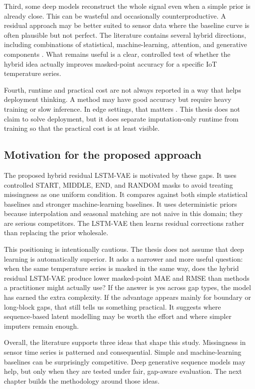 Third, some deep models reconstruct the whole signal even when a simple prior is already close. This can be wasteful and occasionally counterproductive. A residual approach may be better suited to sensor data where the baseline curve is often plausible but not perfect. The literature contains several hybrid directions, including combinations of statistical, machine-learning, attention, and generative components \cite{Lyu2022,Ou2024MissingDataIW,Zhang2024DiffPuterED}. What remains useful is a clear, controlled test of whether the hybrid idea actually improves masked-point accuracy for a specific IoT temperature series.

Fourth, runtime and practical cost are not always reported in a way that helps deployment thinking. A method may have good accuracy but require heavy training or slow inference. In edge settings, that matters \cite{Erhan2021CriticalCO}. This thesis does not claim to solve deployment, but it does separate imputation-only runtime from training so that the practical cost is at least visible.

\subsection{Motivation for the proposed approach}

The proposed hybrid residual LSTM-VAE is motivated by these gaps. It uses controlled START, MIDDLE, END, and RANDOM masks to avoid treating missingness as one uniform condition. It compares against both simple statistical baselines and stronger machine-learning baselines. It uses deterministic priors because interpolation and seasonal matching are not naive in this domain; they are serious competitors. The LSTM-VAE then learns residual corrections rather than replacing the prior wholesale.

This positioning is intentionally cautious. The thesis does not assume that deep learning is automatically superior. It asks a narrower and more useful question: when the same temperature series is masked in the same way, does the hybrid residual LSTM-VAE produce lower masked-point MAE and RMSE than methods a practitioner might actually use? If the answer is yes across gap types, the model has earned the extra complexity. If the advantage appears mainly for boundary or long-block gaps, that still tells us something practical. It suggests where sequence-based latent modelling may be worth the effort and where simpler imputers remain enough.

Overall, the literature supports three ideas that shape this study. Missingness in sensor time series is patterned and consequential. Simple and machine-learning baselines can be surprisingly competitive. Deep generative sequence models may help, but only when they are tested under fair, gap-aware evaluation. The next chapter builds the methodology around those ideas.

